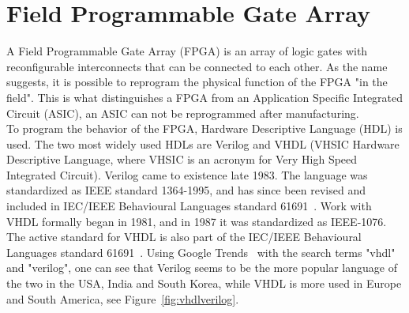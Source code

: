 
\section{Field Programmable Gate Array}
A Field Programmable Gate Array (FPGA) is an array of logic gates with reconfigurable interconnects that can be connected to each other. As the name suggests, it is possible to reprogram the physical function of the FPGA "in the field". This is what distinguishes a FPGA from an Application Specific Integrated Circuit (ASIC), an ASIC can not be reprogrammed after manufacturing.\\ %

To program the behavior of the FPGA, Hardware Descriptive Language (HDL) is used. The two most widely used HDLs are Verilog and VHDL (VHSIC Hardware Descriptive Language, where VHSIC is an acronym for Very High Speed Integrated Circuit). Verilog came to existence late 1983. The language was standardized as IEEE standard 1364-1995, and has since been revised and included in IEC/IEEE Behavioural Languages standard 61691~\cite{IEEEVerilog}. Work with VHDL formally began in 1981, and in 1987 it was standardized as IEEE-1076. The active standard for VHDL is also part of the IEC/IEEE Behavioural Languages standard 61691~\cite{IEEEVHDL}. Using Google Trends~\cite{googletrends} with the search terms "vhdl" and "verilog", one can see that Verilog seems to be the more popular language of the two in the USA, India and South Korea, while VHDL is more used in Europe and South America, see Figure~\ref{fig:vhdlverilog}.

